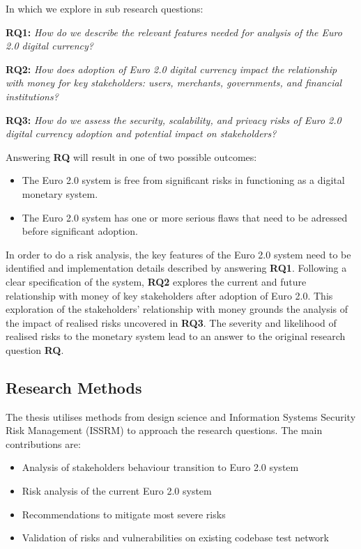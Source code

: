 \documentclass[12pt]{article} %
\begin{document}
In which we explore in sub research questions:
\begin{quoting}
\textbf{RQ1: }\textit{How do we describe the relevant features needed for analysis of the Euro 2.0 digital currency?}
\end{quoting}
\begin{quoting}
\textbf{RQ2: }\textit{How does adoption of Euro 2.0 digital currency impact the relationship with money for key stakeholders: users, merchants, governments, and financial institutions?}
\end{quoting}
\begin{quoting}
\textbf{RQ3: }\textit{How do we assess the security, scalability, and privacy risks of Euro 2.0 digital currency adoption and potential impact on stakeholders?}
\end{quoting}

Answering \textbf{RQ} will result in one of two possible outcomes:
\begin{itemize}
	\item The Euro 2.0 system is free from significant risks in functioning as a digital monetary system.
	\item The Euro 2.0 system has one or more serious flaws that need to be adressed before significant adoption.
\end{itemize}
In order to do a risk analysis, the key features of the Euro 2.0 system need to be identified and implementation details described by answering \textbf{RQ1}. Following a clear specification of the system, \textbf{RQ2} explores the current and future relationship with money of key stakeholders after adoption of Euro 2.0. This exploration of the stakeholders' relationship with money grounds the analysis of the impact of realised risks uncovered in \textbf{RQ3}. The severity and likelihood of realised risks to the monetary system lead to an answer to the original research question \textbf{RQ}.

\subsection{Research Methods} \label{ssec:1.3}
The thesis utilises methods from design science and Information Systems Security Risk Management (ISSRM) to approach the research questions. The main contributions are:
\begin{itemize}
	\item Analysis of stakeholders behaviour transition to Euro 2.0 system
	\item Risk analysis of the current Euro 2.0 system
	\item Recommendations to mitigate most severe risks
	\item Validation of risks and vulnerabilities on existing codebase test network
\end{itemize}
\end{document}
